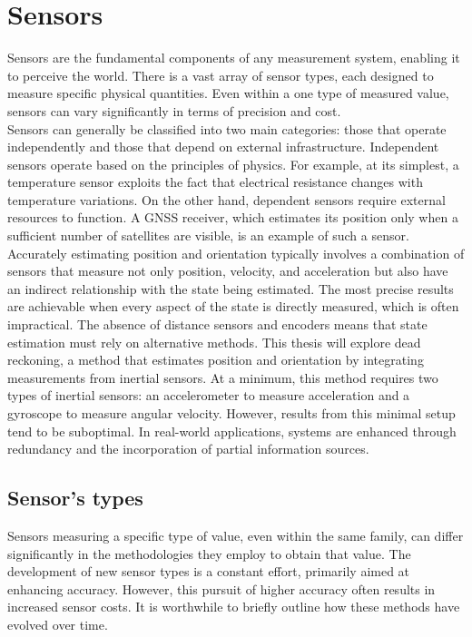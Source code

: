 \chapter{Sensors}

Sensors are the fundamental components of any measurement system, enabling it to perceive the world. There is a vast array of sensor types, each designed to measure specific physical quantities. Even within a one type of measured value, sensors can vary significantly in terms of precision and cost. \\

Sensors can generally be classified into two main categories: those that operate independently and those that depend on external infrastructure. Independent sensors operate based on the principles of physics. For example, at its simplest, a temperature sensor exploits the fact that electrical resistance changes with temperature variations. On the other hand, dependent sensors require external resources to function. A GNSS receiver, which estimates its position only when a sufficient number of satellites are visible, is an example of such a sensor.\\

Accurately estimating position and orientation typically involves a combination of sensors that measure not only position, velocity, and acceleration but also have an indirect relationship with the state being estimated. The most precise results are achievable when every aspect of the state is directly measured, which is often impractical. The absence of distance sensors and encoders means that state estimation must rely on alternative methods. This thesis will explore dead reckoning, a method that estimates position and orientation by integrating measurements from inertial sensors. At a minimum, this method requires two types of inertial sensors: an accelerometer to measure acceleration and a gyroscope to measure angular velocity. However, results from this minimal setup tend to be suboptimal. In real-world applications, systems are enhanced through redundancy and the incorporation of partial information sources.

\section{Sensor's types}

Sensors measuring a specific type of value, even within the same family, can differ significantly in the methodologies they employ to obtain that value. The development of new sensor types is a constant effort, primarily aimed at enhancing accuracy. However, this pursuit of higher accuracy often results in increased sensor costs. It is worthwhile to briefly outline how these methods have evolved over time.\\

